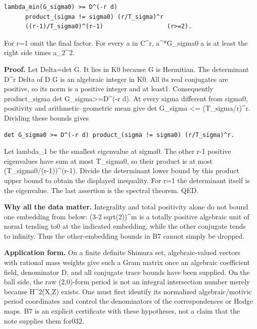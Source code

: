 \begin{verbatim}
lambda_min(G_sigma0) >= D^(-r d)
      product_(sigma != sigma0) (r/T_sigma)^r
      ((r-1)/T_sigma0)^(r-1)                  (r>=2).
\end{verbatim}

For r=1 omit the final factor. For every a in C\^{}r, a\^{}*G\_sigma0 a is at least the right side times \textbar\textbar a\textbar\textbar\_2\^{}2.

\textbf{Proof.} Let Delta=det G. It lies in K0 because G is Hermitian. The determinant D\^{}r Delta of D G is an algebraic integer in K0. All its real conjugates are positive, so its norm is a positive integer and at least1. Consequently product\_sigma det G\_sigma\textgreater=D\^{}(-r d). At every sigma different from sigma0, positivity and arithmetic--geometric mean give det G\_sigma \textless= (T\_sigma/r)\^{}r. Dividing these bounds gives

\begin{verbatim}
det G_sigma0 >= D^(-r d) product_(sigma != sigma0) (r/T_sigma)^r.
\end{verbatim}

Let lambda\_1 be the smallest eigenvalue at sigma0. The other r-1 positive eigenvalues have sum at most T\_sigma0, so their product is at most (T\_sigma0/(r-1))\^{}(r-1). Divide the determinant lower bound by this product upper bound to obtain the displayed inequality. For r=1 the determinant itself is the eigenvalue. The last assertion is the spectral theorem. QED.

\textbf{Why all the data matter.} Integrality and total positivity alone do not bound one embedding from below: (3-2 sqrt(2))\^{}m is a totally positive algebraic unit of norm1 tending to0 at the indicated embedding, while the other conjugate tends to infinity. Thus the other-embedding bounds in B7 cannot simply be dropped.

\textbf{Application form.} On a finite definite Shimura set, algebraic-valued vectors with rational mass weights give such a Gram matrix once an algebraic coefficient field, denominator D, and all conjugate trace bounds have been supplied. On the ball side, the raw (2,0)-form period is not an integral intersection number merely because H\^{}2(X,Z) exists. One must first identify its normalized algebraic/motivic period coordinates and control the denominators of the correspondences or Hodge maps. B7 is an explicit certificate with these hypotheses, not a claim that the note supplies them for032.

